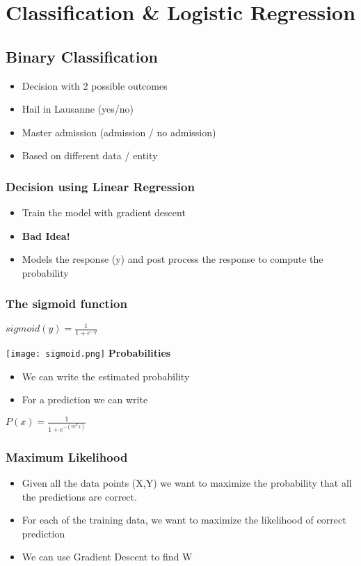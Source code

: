 \section{Classification \& Logistic Regression}
\subsection{Binary Classification}
\begin{itemize}
    \item Decision with 2 possible outcomes
    \item Hail in Lausanne (yes/no)
    \item Master admission (admission / no admission)
    \item Based on different data / entity
\end{itemize}

\subsubsection{Decision using Linear Regression}
\begin{itemize}
    \item Train the model with gradient descent
    \item \textbf{Bad Idea!}
    \item Models the response (y) and post process the response to compute the probability
\end{itemize}

\subsubsection{The sigmoid function}
\begin{center}
    $sigmoid(y) = \frac{1}{1 + e^{-y}}$
\end{center}
\texttt{[image: sigmoid.png]}
\textbf{Probabilities}
\begin{itemize}
    \item We can write the estimated probability
    \item For a prediction we can write
\end{itemize}
\begin{center}
    $P(x) = \frac{1}{1 + e^{-(W^{T}x)}}$
\end{center}

\subsubsection{Maximum Likelihood}
\begin{itemize}
    \item Given all the data points (X,Y) we want to maximize the probability that all the predictions are correct.
    \item For each of the training data, we want to maximize the likelihood of correct prediction
    \item We can use Gradient Descent to find W
\end{itemize}
